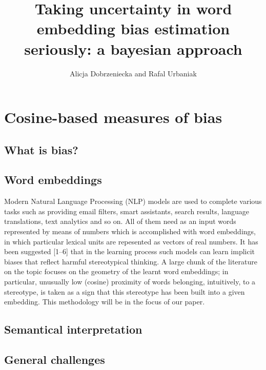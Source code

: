 \documentclass[
  10pt,
  dvipsnames,enabledeprecatedfontcommands, twocolumn]{scrartcl}
\title{Taking uncertainty in word embedding bias estimation seriously: a
bayesian approach}
\author{Alicja Dobrzeniecka and Rafal Urbaniak}
\date{}
\begin{document}
\maketitle

\hypertarget{cosine-based-measures-of-bias}{%
\section{Cosine-based measures of
bias}\label{cosine-based-measures-of-bias}}

\hypertarget{what-is-bias}{%
\subsection{What is bias?}\label{what-is-bias}}

\hypertarget{word-embeddings}{%
\subsection{Word embeddings}\label{word-embeddings}}

Modern Natural Language Processing (NLP) models are used to complete
various tasks such as providing email filters, smart assistants, search
results, language translations, text analytics and so on. All of them
need as an input words represented by means of numbers which is
accomplished with word embeddings, in which particular lexical units are
repesented as vectors of real numbers. It has been suggested {[}1--6{]}
that in the learning process such models can learn implicit biases that
reflect harmful stereotypical thinking. A large chunk of the literature
on the topic focuses on the geometry of the learnt word embeddings; in
particular, unusually low (cosine) proximity of words belonging,
intuitively, to a stereotype, is taken as a sign that this stereotype
has been built into a given embedding. This methodology will be in the
focus of our paper.

\hypertarget{semantical-interpretation}{%
\subsection{Semantical interpretation}\label{semantical-interpretation}}

\hypertarget{general-challenges}{%
\subsection{General challenges}\label{general-challenges}}
\end{document}
